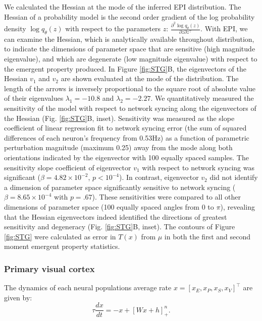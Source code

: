 \documentclass[11pt]{article}
\begin{document}
We calculated the Hessian at the mode of the inferred EPI distribution.  
The Hessian of a probability model is the second order gradient of the log probability density $\log q_\theta(z)$ with respect to the parameters $z$:  $\frac{\partial^2 \log q_\theta(z)}{\partial z \partial z^\top}$.  
With EPI, we can examine the Hessian, which is analytically available throughout distribution, to indicate the dimensions of parameter space that are sensitive (high magnitude eigenvalue), and which are degenerate (low magnitude eigenvalue) with respect to the emergent property produced. 
In Figure \ref{fig:STG}B, the eigenvectors of the Hessian $v_1$ and $v_2$ are shown evaluated at the mode of the distribution.  
The length of the arrows is inversely proportional to the square root of absolute value of their eigenvalues $\lambda_1 = -10.8$ and $\lambda_2 = -2.27$.
We quantitatively measured the sensitivity of the model with respect to network syncing along the eigenvectors of the Hessian (Fig. \ref{fig:STG}B, inset).
Sensitivity was measured as the slope coefficient of linear regression fit to network syncing error (the sum of squared differences of each neuron's frequency from 0.53Hz) as a function of parametric perturbation magnitude (maximum 0.25) away from the mode along both orientations indicated by the eigenvector with 100 equally spaced samples.
The sensitivity slope coefficient of eigenvector $v_1$ with respect to network syncing was significant ($\beta = 4.82 \times 10^{-2}$, $p<10^{-4}$).
In contrast, eigenvector $v_2$ did not identify a dimension of parameter space significantly sensitive to network syncing ($\beta = 8.65 \times 10^{-4}$ with $p=.67$).
These sensitivities were compared to all other dimensions of parameter space (100 equally spaced angles from 0 to $\pi$), revealing that the Hessian eigenvectors indeed identified the directions of greatest sensitivity and degeneracy (Fig. \ref{fig:STG}B, inset).
The contours of Figure \ref{fig:STG} were calculated as error in $T(x)$ from $\mu$ in both the first and second moment emergent property statistics.

\subsubsection{Primary visual cortex}\label{methods_V1}
The dynamics of each neural populations average rate
$x = [ x_E, x_P, x_S, x_V]^\top$
are given by:
\begin{equation}
\tau \frac{dx}{dt} = -x + [W x+ h]_+^n.
\end{equation}
\end{document}
